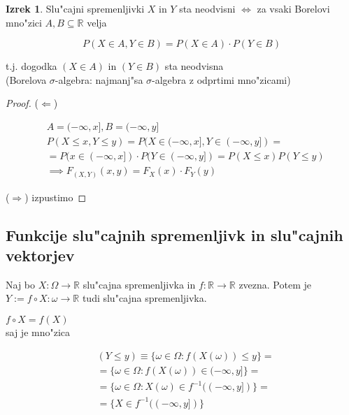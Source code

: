 \documentclass[a4paper,12pt]{article}
\theoremstyle{definition}
\newtheorem{theorem}[counter]{Izrek}
\theoremstyle{remark}
\newcommand{\R}{\mathbb{R}}
\begin{document}
\begin{theorem}
    Slu"cajni spremenljivki $X$ in $Y$ sta neodvisni $\iff$ za vsaki Borelovi mno"zici $A, B \subseteq \R$ velja

    \begin{equation*}
        P(X \in A, Y \in B) = P(X \in A) \cdot P(Y \in B)
    \end{equation*}

    t.j. dogodka $(X \in A)$ in $(Y \in B)$ sta neodvisna \\
    (Borelova $\sigma$-algebra: najmanj"sa $\sigma$-algebra z odprtimi mno"zicami)
\end{theorem}

\begin{proof}
    ($\Leftarrow$)

    \begin{align*}
        &A = (-\infty, x], B = (-\infty, y] \\
        &P(X \leq x, Y \leq y) = P(X \in (-\infty, x], Y \in (-\infty, y]) = \\
        &= P(x \in (-\infty, x]) \cdot P(Y \in (-\infty, y]) = P(X \leq x) P(Y \leq y) \\
        &\implies F_{(X,Y)}(x,y) = F_X(x) \cdot F_Y(y)
    \end{align*}

    ($\Rightarrow$) izpustimo
\end{proof}

\subsection{Funkcije slu"cajnih spremenljivk in slu"cajnih vektorjev}

Naj bo $X: \Omega \to \R$ slu"cajna spremenljivka in $f: \R \to \R$ zvezna. Potem je $Y := f \circ X: \omega \to \R$
tudi slu"cajna spremenljivka.




$f \circ X = f(X)$ \\
saj je mno"zica

\begin{align*}
    &(Y \leq y) \equiv \{\omega \in \Omega: f(X(\omega)) \leq y\} = \\
    &= \{\omega \in \Omega: f(X(\omega)) \in (-\infty, y]\} = \\
    &= \{\omega \in \Omega: X(\omega) \in f^{-1}((-\infty, y])\} = \\
    &= \{X \in f^{-1}((-\infty, y])\} 
\end{align*}
\end{document}
